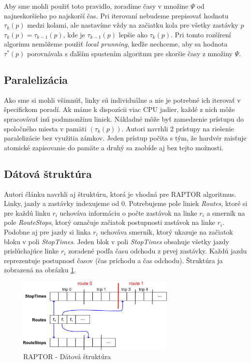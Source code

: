 Aby sme mohli použiť toto pravidlo, zoradíme časy v množine $\Psi$ od najneskoršieho po najskorší čas. Pri iterovaní nebudeme prepisovať hodnotu $\tau_k(p)$ medzi kolami, ale nastavíme vždy na začiatku kola pre všetky zastávky $p$ $\tau_k(p) = \tau_{k-1}(p)$, kde je $\tau_{k-1}(p)$ lepšie ako $\tau_k(p)$. Pri tomto rozšírení algorimu nemôžeme použiť \textit{local prunning}, keďže nechceme, aby sa hodnota $\tau^*(p)$ porovnávala s ďalším spustením algoritmu pre skoršie časy z množiny $\Psi$. 


\subsection{Paralelizácia}
Ako sme si mohli všimnúť, linky sú individuálne a nie je potrebné ich iterovať v špecifickom poradí. Ak máme k dispozícii viac CPU jadier, každé z nich môže spracovávať inú podmnonžinu liniek. Nákladné môže byť zamedzenie prístupu do spoločného miesta v pamäti $(\tau_k(p))$. Autori navrhli 2 prístupy na riešenie paralelizácie bez využitia zámkov. Jeden prístup počíta s tým, že hardvér zaisťuje atomické zapisovanie do pamäte a druhý sa zaobíde aj bez tejto možnosti. 

\subsection{Dátová štruktúra}
\label{subsec:structure}
Autori článku navrhli aj štruktúru, ktorá je vhodná pre RAPTOR algoritmus. Linky, jazdy a zastávky indexujeme od $0$. Potrebujeme pole liniek \textit{Routes}, ktoré si pre každú linku $r_i$ uchováva informáciu o počte zastávok na linke $r_i$ a smerník na pole \textit{RouteStops}, ktorý označuje začiatok postupnosti zastávok na linke $r_i$. Podobne aj pre jazdy si linka $r_i$ uchováva smerník, ktorý ukazuje na začiatok bloku v poli \textit{StopTimes}. Jeden blok v poli \textit{StopTimes} obsahuje všetky jazdy prislúchajúce linke $r_i$ zoradené podľa času odchodu z prvej zastávky. Každú jazdu reprezentuje postupnosť časov (čas príchodu a čas odchodu). Štruktúra ja zobrazená na obrázku \ref{fig:raptor-structure}. 

\begin{figure}[H]
\centerline{\includegraphics[width=0.7\textwidth]{images/raptor-structure}}
\caption[RAPTOR - Dátová štruktúra]{RAPTOR - Dátová štruktúra}
\label{fig:raptor-structure}
\end{figure}

